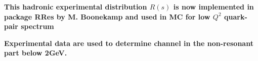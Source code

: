 \documentclass[dvips]{seminar}                      %
\begin{document}
\begin{slide}


\begin{minipage}{52mm}
\end{minipage}
\begin{minipage}{52mm}
\small\bf
This hadronic experimental distribution $R(s)$ is now implemented in package RRes by M. Boonekamp
and used in \KK MC for low $Q^2$ quark-pair spectrum
\end{minipage}

\vfill
\end{slide}    %


\begin{slide}
\begin{center}
\end{center}

\small\bf
Experimental data are used to determine channel in the non-resonant part below 2GeV.

\vfill
\end{slide}    %


\end{document}
